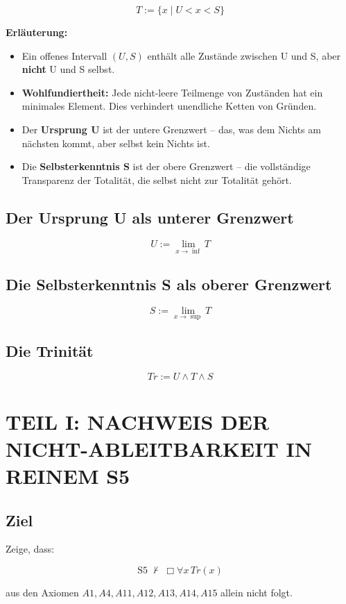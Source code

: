 \documentclass[
]{article}
\begin{document}
\[
\boxed{T := \{ x \mid U < x < S \}}
\]

\textbf{Erläuterung:}
\begin{itemize}
\item Ein offenes Intervall \((U, S)\) enthält alle Zustände zwischen U und S, aber \textbf{nicht} U und S selbst.
\item \textbf{Wohlfundiertheit:} Jede nicht-leere Teilmenge von Zuständen hat ein minimales Element. Dies verhindert unendliche Ketten von Gründen.
\item Der \textbf{Ursprung U} ist der untere Grenzwert – das, was dem Nichts am nächsten kommt, aber selbst kein Nichts ist.
\item Die \textbf{Selbsterkenntnis S} ist der obere Grenzwert – die vollständige Transparenz der Totalität, die selbst nicht zur Totalität gehört.
\end{itemize}

\subsection{Der Ursprung U als unterer Grenzwert}

\[
\boxed{U := \lim_{x \to \inf} T}
\]

\subsection{Die Selbsterkenntnis S als oberer Grenzwert}

\[
\boxed{S := \lim_{x \to \sup} T}
\]

\subsection{Die Trinität}

\[
\boxed{Tr := U \land T \land S}
\]

\section{TEIL I: NACHWEIS DER NICHT-ABLEITBARKEIT IN REINEM S5}

\subsection{Ziel}

Zeige, dass:

\[
\boxed{\text{S5} \;\not\vdash\; \Box\forall x\,Tr(x)}
\]

aus den Axiomen \(A1, A4, A11, A12, A13, A14, A15\) allein nicht folgt.
\end{document}
